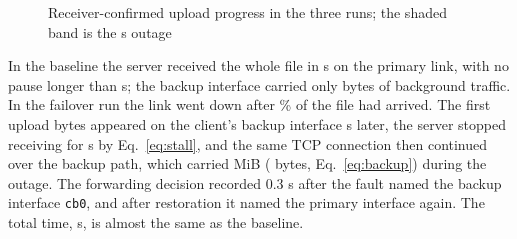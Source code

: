 \documentclass[12pt,a4paper]{report}
\numberwithin{equation}{chapter}
\begin{document}
\begin{figure}[H]
\centering
{}
\caption{Receiver-confirmed upload progress in the three runs; the shaded band is the \upOutage{} s outage}
\label{fig:uploadprogress}
\end{figure}

In the baseline the server received the whole file in \upBaseTotal{} s on the primary link, with no pause longer than \upBaseStall{} s; the backup interface carried only \upBaseBackupBytes{} bytes of background traffic. In the failover run the link went down after \upFaultPct\% of the file had arrived. The first upload bytes appeared on the client's backup interface \upFailFirstBackup{} s later, the server stopped receiving for \upFailStall{} s by Eq.~\eqref{eq:stall}, and the same TCP connection then continued over the backup path, which carried \upFailBackupMiB{} MiB (\upFailBackupBytes{} bytes, Eq.~\eqref{eq:backup}) during the outage. The forwarding decision recorded 0.3 s after the fault named the backup interface \texttt{cb0}, and after restoration it named the primary interface again. The total time, \upFailTotal{} s, is almost the same as the baseline.
\end{document}
